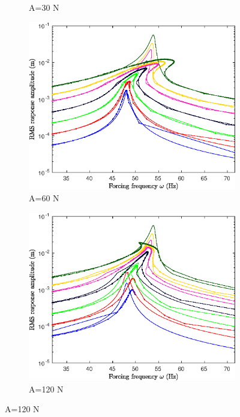 \documentclass[aspectratio=169]{beamer}
\begin{document}
\begin{frame}
\begin{figure}
\begin{subfigure}{0.25\linewidth}
      \caption{A=30 N}
    \end{subfigure}%
    \begin{subfigure}{0.25\linewidth}
      \includegraphics[width=\linewidth]{../../benchmark5/FIGURES/pnlssfrf_Amp_b5_A60_up4_ms_full_na2_nx23}
      \caption{A=60 N}
    \end{subfigure}%
    \begin{subfigure}{0.25\linewidth}
      \includegraphics[width=\linewidth]{../../benchmark5/FIGURES/pnlssfrf_Amp_b5_A120_up4_ms_full_na2_nx23}
      \caption{A=120 N}
    \end{subfigure}
  \end{figure}
\end{frame}
\end{document}
